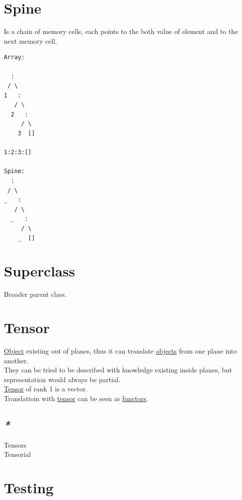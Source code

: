 \documentclass[a4paper,14pt,oneside]{book}
\begin{document}
\chapter{\label{orgd2683e8}Spine}
\label{sec:orgfce669f}
Is a chain of memory cells, each points to the both value of element and to the next memory cell.\\
\begin{verbatim}
Array:

  :
 / \
1   :
   / \
  2   :
     / \
    3  []

1:2:3:[]

Spine:
  :
 / \
_   :
   / \
  _   :
     / \
    _  []

\end{verbatim}

\chapter{\label{orgc60f02c}Superclass}
\label{sec:orgd5d0bf9}
Broader parent class.\\

\chapter{\label{orga2d4467}Tensor}
\label{sec:org8df2e0f}
\hyperref[org5771609]{Object} existing out of planes, thus it can translate \hyperref[org22f7883]{objects} from one plane into another.\\
They can be tried to be described with knowledge existing inside planes, but representation would always be partial.\\
\hyperref[orga2d4467]{Tensor} of rank 1 is a vector.\\

Translatioin with \hyperref[orga2d4467]{tensor} can be seen as \hyperref[orgcde2498]{functors}.\\

\section{\emph{*}}
\label{sec:org8388f7a}

\label{org746e487}Tensors\\
\label{org648c464}Tensorial\\

\chapter{\label{orgb234d91}Testing}
\label{sec:orgf4b7502}
\end{document}
